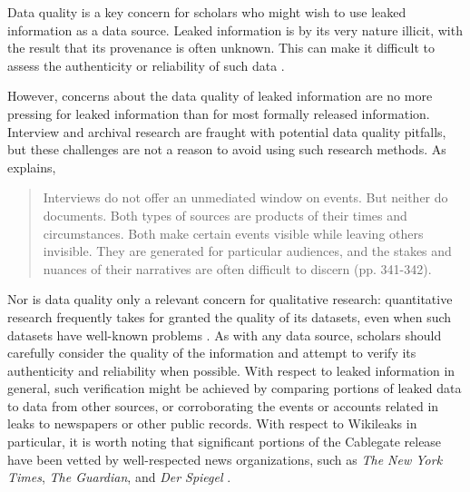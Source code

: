 \documentclass[12pt]{article}
\begin{document}
Data quality is a key concern for scholars who might wish to use leaked information as a data source. 
Leaked information is by its very nature illicit, with the result that its provenance is often unknown. 
This can make it difficult to assess the authenticity 
or reliability of such data \citep{kelly2012wikileaks:}.

However, concerns about the data quality of leaked information are no more pressing for 
leaked information than for most formally released information. Interview and archival research are 
fraught with potential data quality pitfalls, but these challenges are not a reason to avoid 
using such research methods. As \citet{hecht2012being} explains,
\begin{quote}
Interviews do not offer an unmediated window on events. But neither do documents. Both 
types of sources are products of their times and circumstances. Both make certain events visible while 
leaving others invisible. They are generated for particular audiences, and the stakes and nuances 
of their narratives are often difficult to discern (pp. 341-342).
\end{quote}
Nor is data quality only a relevant concern for qualitative research: 
quantitative research frequently takes for granted the quality of its datasets, even 
when such datasets have well-known problems \citep{herrera2007improving}.
As with any data source, scholars should 
carefully consider the quality of the information and attempt to verify its authenticity and 
reliability when possible. With respect to leaked information in general, such verification might be 
achieved by 
comparing portions of leaked data to data from other sources, or corroborating the events or accounts related 
in leaks to newspapers or other public records.
With respect to Wikileaks in particular, it is worth noting that significant portions of the Cablegate release 
have been vetted by well-respected news organizations, such as \emph{The New York Times}, 
\emph{The Guardian}, and \emph{Der Spiegel} \citep{debevec2010professor:}.
\end{document}
